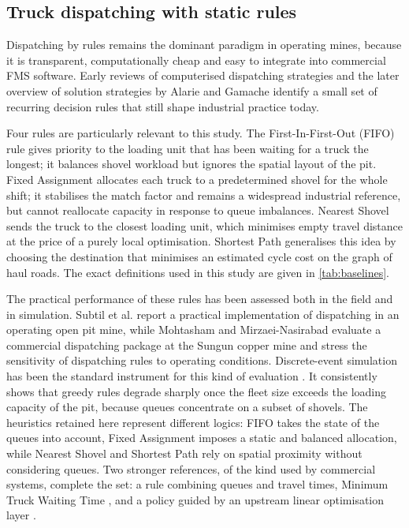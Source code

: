\documentclass[11pt,a4paper]{article}
\newif\ifrevmarks
\newcommand{\revtag}[1]{\ifrevmarks\textsuperscript{\textcolor{red!70!black}{\scriptsize[#1]}}\fi}
\newcommand{\rev}[2]{\ifrevmarks{\color{revcolor}#2}\revtag{#1}\else#2\fi}
\newenvironment{revbloc}[1]{\par\ifrevmarks\color{revcolor}\noindent\revtag{#1}\ \fi}{\par}
\newif\ifcorrmarks
\newcommand{\corr}[1]{\ifcorrmarks\textcolor{corrcolor}{#1}\else#1\fi}
\begin{document}
\subsection{Truck dispatching with static rules}

Dispatching by rules remains the dominant paradigm in operating mines, because it is transparent, computationally cheap and easy to integrate into commercial FMS software. Early reviews of computerised dispatching strategies \cite{MohanMunirathinam1994} and the later overview of solution strategies by Alarie and Gamache \cite{Alarie2002} identify a small set of recurring decision rules that still shape industrial practice today.

\begin{revbloc}{M25, Dir. corr. 1}
Four rules are particularly relevant to this study. The First-In-First-Out (FIFO) rule gives priority to the loading unit that has been waiting for a truck the longest; it balances shovel workload but ignores the spatial layout of the pit. Fixed Assignment allocates each truck to a predetermined shovel for the whole shift; it stabilises the match factor and remains a widespread industrial reference, but cannot reallocate capacity in response to queue imbalances. Nearest Shovel sends the truck to the closest loading unit, which minimises empty travel distance at the price of a purely local optimisation. Shortest Path generalises this idea by choosing the destination that minimises an estimated cycle cost on the graph of haul roads. The exact definitions used in this study are given in \cref{tab:baselines}.
\end{revbloc}

The practical performance of these rules has been assessed both in the field and in simulation. Subtil et al. \cite{Subtil2011} report a practical implementation of dispatching in an operating \corr{open pit} mine, while Mohtasham and Mirzaei-Nasirabad \cite{MehrnazMohtasham2023} evaluate a commercial dispatching package at the Sungun copper mine and stress the sensitivity of dispatching rules to operating conditions. Discrete-event simulation has been the standard instrument for this kind of evaluation \cite{NecmettinCetin2004, MarceloFioroni2008, Zeng2022, MiladAbolghasemian2020}. It consistently shows that greedy rules degrade sharply once the fleet size exceeds the loading capacity of the pit, because queues concentrate on a subset of shovels. \rev{M25, m5, T31}{The heuristics retained here represent different logics: FIFO takes the state of the queues into account, Fixed Assignment imposes a static and balanced allocation, while Nearest Shovel and Shortest Path rely on spatial proximity without considering queues. Two stronger references, of the kind used by commercial systems, complete the set: a rule combining queues and travel times, Minimum Truck Waiting Time \cite{Zeng2022}, and a policy guided by an upstream linear optimisation layer \cite{Soumis1989, AmandaSmith2020}.}
\end{document}
